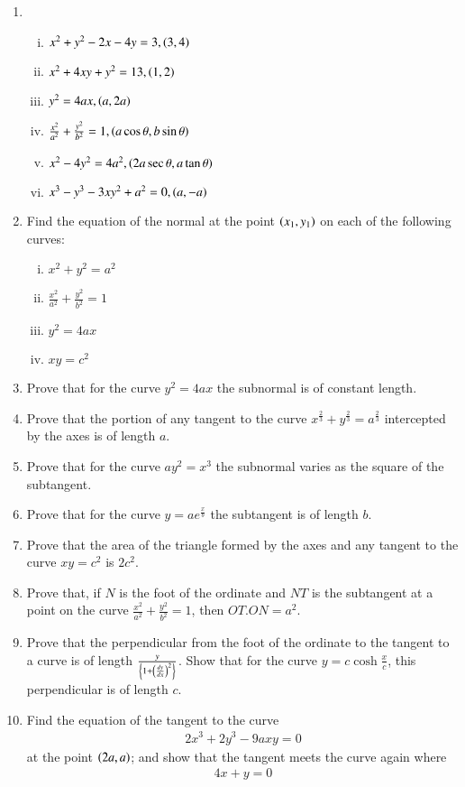 \begin{enumerate}[1.]
\item
\begin{enumerate}[(i)]
\item
$
x^2+y^2-2x-4y=3, \left(3,4\right)
$
\item
$
x^2+4xy + y^2 = 13, \left(1,2\right)
$
\item
$
y^2=4ax, \left(a,2a\right)
$
\item
$
\frac{x^2}{a^2}+\frac{y^2}{b^2}=1, \left(a\cos\theta,b\sin\theta\right)
$
\item
$
x^2-4y^2 = 4a^2, \left(2a\sec\theta,a\tan\theta\right)
$
\item
$
x^3-y^3-3xy^2+a^2 = 0, \left(a,-a\right)
$
\end{enumerate}
\item Find the equation of the normal at the point $\left(x_1,y_1\right)$ on each of the following curves:
\begin{enumerate}[(i)]
\item
$
x^2+y^2 = a^2
$
\item
$
\frac{x^2}{a^2}+\frac{y^2}{b^2}=1
$
\item
$
y^2=4ax
$
\item
$
xy=c^2
$
\end{enumerate}
\item Prove that for the curve $y^2=4ax$ the subnormal is of constant length.
\item Prove that the portion of any tangent to the curve $x^{\frac{2}{3}}+y^{\frac{2}{3}}=a^{\frac{2}{3}}$ intercepted by the axes is of length $a$.
\item Prove that for the curve $ay^2=x^3$ the subnormal varies as the square of the subtangent.
\item Prove that for the curve $y=ae^{\frac{x}{b}}$ the subtangent is of length $b$.
\item Prove that the area of the triangle formed by the axes and any tangent to the curve $xy=c^2$ is $2c^2$.
\item Prove that, if $N$ is the foot of the ordinate and $NT$ is the subtangent at a point on the
curve $\frac{x^2}{a^2}+\frac{y^2}{b^2}=1$, then $OT.ON=a^2$.
\item Prove that the perpendicular from the foot of the ordinate to the tangent to a curve is of length
$\frac{y}{\left\{1+\left(\frac{dy}{dx}\right)^2\right\}}$.  Show that for the curve $y = c\cosh \frac{x}{c}$, this perpendicular is of length $c$.
\item Find the equation of the tangent to the curve 
\begin{align*}
2x^3+2y^3 - 9axy = 0
\end{align*}
at the point $\left(2a,a\right)$; and show that the tangent meets the curve again where 
\begin{align*}
4x+y = 0
\end{align*}
\end{enumerate}